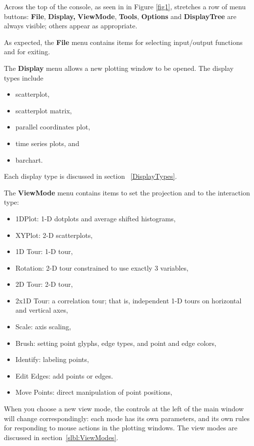 \documentclass[11pt]{article}
\begin{document}
Across the top of the console, as seen in in Figure \ref{fig1},
stretches a row of menu buttons:  {\bf File}, {\bf Display,} {\bf
ViewMode}, {\bf Tools}, {\bf Options} and {\bf DisplayTree} are
always visible; others appear as appropriate.

As expected, the {\bf File} menu contains items for selecting
input/output functions and for exiting.

The {\bf Display} menu allows a new plotting window to be opened. 
The display types include
\begin{itemize}
\itemsep 0em
\item scatterplot,
\item scatterplot matrix, 
\item parallel coordinates plot, 
\item time series plots, and
\item barchart.
\end{itemize}

Each display type
is discussed in section ~\ref{DisplayTypes}.

The {\bf ViewMode} menu contains items to set the projection 
and to the interaction type:
\begin{itemize}
\itemsep 0em
\item 1DPlot: 1-D dotplots and average shifted histograms,
\item XYPlot: 2-D scatterplots,
\item 1D Tour: 1-D tour,
\item Rotation: 2-D tour constrained to use exactly 3 variables,
\item 2D Tour: 2-D tour,
\item 2x1D Tour: a correlation tour; that is, independent 1-D tours on
      horizontal and vertical axes,
\item Scale: axis scaling,
\item Brush: setting point glyphs, edge types, and point and edge colors,
\item Identify: labeling points,
\item Edit Edges: add points or edges.
\item Move Points: direct manipulation of point positions,
\end{itemize}

When you choose a new view mode, the controls at the left of the main
window will change correspondingly:  each mode has its own
parameters, and its own rules for responding to mouse actions in the
plotting windows.  The view modes are discussed in
section~\ref{slbl:ViewModes}.
\end{document}
